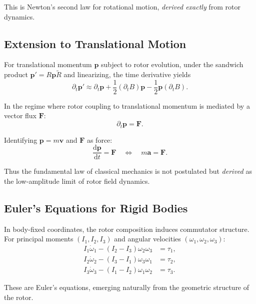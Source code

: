 \documentclass[11pt,a4paper]{article}
\numberwithin{equation}{section}
\theoremstyle{plain}
\theoremstyle{definition}
\theoremstyle{remark}
\newcommand{\rev}[1]{\widetilde{#1}}       %
\newcommand{\dd}{\mathrm{d}}
\begin{document}
This is Newton's second law for rotational motion, \emph{derived exactly} from rotor dynamics.

\subsection{Extension to Translational Motion}

For translational momentum $\mathbf{p}$ subject to rotor evolution, under the sandwich product $\mathbf{p}' = R\mathbf{p}\rev{R}$ and linearizing, the time derivative yields
\begin{equation}
\partial_t \mathbf{p}' \approx \partial_t \mathbf{p} + \frac{1}{2}(\partial_t B)\mathbf{p} - \frac{1}{2}\mathbf{p}(\partial_t B).
\end{equation}

In the regime where rotor coupling to translational momentum is mediated by a vector flux $\mathbf{F}$:
\begin{equation}
\partial_t \mathbf{p} = \mathbf{F}.
\end{equation}

Identifying $\mathbf{p} = m\mathbf{v}$ and $\mathbf{F}$ as force:
\begin{equation}
\boxed{\frac{\dd\mathbf{p}}{\dd t} = \mathbf{F} \quad \Longleftrightarrow \quad m\mathbf{a} = \mathbf{F}.}
\label{eq:newton-translational}
\end{equation}

Thus the fundamental law of classical mechanics is not postulated but \emph{derived} as the low-amplitude limit of rotor field dynamics.

\subsection{Euler's Equations for Rigid Bodies}

In body-fixed coordinates, the rotor composition induces commutator structure. For principal moments $(I_1, I_2, I_3)$ and angular velocities $(\omega_1,\omega_2,\omega_3)$:
\begin{align}
I_1\dot{\omega}_1 - (I_2-I_3)\omega_2\omega_3 &= \tau_1,\\
I_2\dot{\omega}_2 - (I_3-I_1)\omega_3\omega_1 &= \tau_2,\\
I_3\dot{\omega}_3 - (I_1-I_2)\omega_1\omega_2 &= \tau_3.
\end{align}

These are Euler's equations, emerging naturally from the geometric structure of the rotor.
\end{document}
